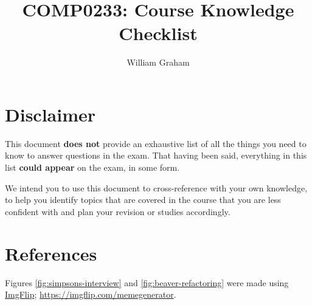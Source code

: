 \documentclass[10pt, a4paper]{article}
\title{COMP0233: Course Knowledge Checklist}
\author{William Graham}
\date{}
\begin{document}
\maketitle

\tableofcontents

\hypersetup{
  linkcolor = magenta,
}

\section*{Disclaimer}

This document \textbf{does not} provide an exhaustive list of all the things you need to know to answer questions in the exam.
That having been said, everything in this list \textbf{could appear} on the exam, in some form.

We intend you to use this document to cross-reference with your own knowledge, to help you identify topics that are covered in the course that you are less confident with and plan your revision or studies accordingly.





\newpage
\section{References}

Figures \ref{fig:simpsons-interview} and \ref{fig:beaver-refactoring} were made using \href{https://imgflip.com/memegenerator}{ImgFlip}; \url{https://imgflip.com/memegenerator}.
\end{document}
